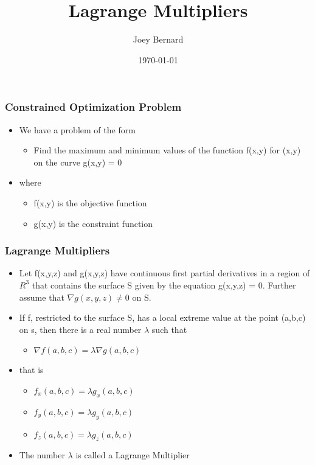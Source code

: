 \documentclass{beamer}
\title{Lagrange Multipliers}
\author{Joey Bernard}
\institute{University of New Brunswick}
\date{\today}
\begin{document}
\begin{frame}
  \titlepage
\end{frame}

\begin{frame}
  \frametitle{Constrained Optimization Problem}
  \begin{itemize}
  \item We have a problem of the form
    \begin{itemize}
    \item Find the maximum and minimum values of the function f(x,y) for (x,y) on the curve g(x,y) = 0
    \end{itemize}
  \item where
    \begin{itemize}
    \item f(x,y) is the objective function
    \item g(x,y) is the constraint function
    \end{itemize}
  \end{itemize}
\end{frame}

\begin{frame}
  \frametitle{Lagrange Multipliers}
  \begin{itemize}
  \item Let f(x,y,z) and g(x,y,z) have continuous first partial derivatives in a region of $R^3$ that contains the surface S given by the equation g(x,y,z) = 0. Further assume that $\nabla g(x,y,z) \ne 0$ on S.
  \item If f, restricted to the surface S, has a local extreme value at the point (a,b,c) on s, then there is a real number $\lambda$ such that
    \begin{itemize}
    \item $\nabla f(a,b,c) = \lambda \nabla g(a,b,c)$
    \end{itemize}
  \item that is
    \begin{itemize}
    \item $f_x(a,b,c) = \lambda g_x(a,b,c)$
    \item $f_y(a,b,c) = \lambda g_y(a,b,c)$
    \item $f_z(a,b,c) = \lambda g_z(a,b,c)$
    \end{itemize}
  \item The number $\lambda$ is called a Lagrange Multiplier
  \end{itemize}
\end{frame}
\end{document}
